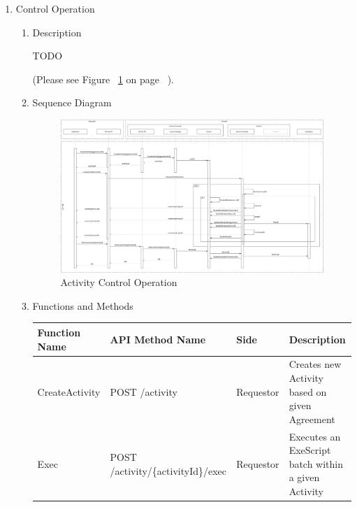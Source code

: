 \begin{enumerate}
\item  Control Operation

\begin{enumerate}

\item Description

TODO

(Please see Figure ~\ref{fig:ACO} on page ~\pageref{fig:ACO}).

\item Sequence Diagram

\begin{figure}[H]
    \centering
    \includegraphics[width=16cm,angle=0]{./diag/Sequence/ActivityControl-B-Sequence.png}
	\caption{Activity Control Operation}
    \label{fig:ACO}
\end{figure}

\item Functions and Methods

\begin{table}[H]
\footnotesize

\begin{center}
\begin{tabular}{|p{3cm}|p{7cm}|p{1.5cm}|p{4cm}|} 
\hline
\rowcolor{lightgray}	Function Name	& API Method Name	& 	Side	&	Description \\
\hline

CreateActivity 				& POST 	/activity	&	Requestor	&  Creates new Activity based on given Agreement	\\
\hline

Exec						& POST /activity/\{activityId\}/exec	&	Requestor 	&  Executes an ExeScript batch within a given Activity	\\
\hline


\end{tabular}
\end{center}
\end{table}
\end{enumerate}
\end{enumerate}
